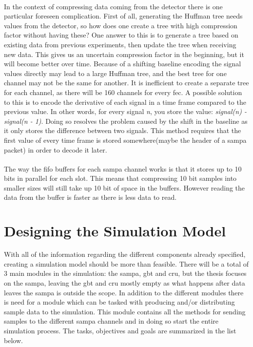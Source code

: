 \documentclass[a4paper, 12pt]{report}
\begin{document}
\paragraph{}
In the context of compressing data coming from the detector there is one particular foreseen complication.
First of all, generating the Huffman tree needs values from the detector, so how does one create a tree with high compression factor without having these?
One answer to this is to generate a tree based on existing data from previous experiments, then update the tree when receiving new data.
This gives us an uncertain compression factor in the beginning, but it will become better over time.
Because of a shifting baseline encoding the signal values directly may lead to a large Huffman tree, and the best tree for one channel may not be the same for another.
It is inefficient to create a separate tree for each channel, as there will be 160 channels for every \gls{fec}.
A possible solution to this is to encode the derivative of each signal in a time frame compared to the previous value.
In other words, for every signal \textit{n}, you store the value: \textit{signal(n) - signal(n - 1)}.
Doing so resolves the problem caused by the shift in the baseline as it only stores the difference between two signals.
This method requires that the first value of every time frame is stored somewhere(maybe the header of a \gls{sampa} packet) in order to decode it later.


\paragraph{}
The way the \gls{fifo} buffers for each \gls{sampa} channel works is that it stores up to 10 bits in parallel for each slot.
This means that compressing 10 bit samples into smaller sizes will still take up 10 bit of space in the buffers. 
However reading the data from the buffer is faster as there is less data to read.

\section{Designing the Simulation Model}
With all of the information regarding the different components already specified, creating a simulation model should be more than feasible.
There will be a total of 3 main modules in the simulation: the \gls{sampa}, \gls{gbt} and \gls{cru}, but the thesis focuses on the \gls{sampa}, leaving the \gls{gbt} and \gls{cru} mostly empty as what happens after data leaves the \gls{sampa} is outside the scope.
In addition to the different modules there is need for a module which can be tasked with producing and/or distributing sample data to the simulation.
This module contains all the methods for sending samples to the different \gls{sampa} channels and in doing so start the entire simulation process.
The tasks, objectives and goals are summarized in the list below.
\end{document}
